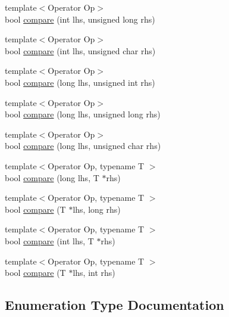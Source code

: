 \begin{DoxyCompactItemize}
\item 
{\footnotesize template$<$Operator Op$>$ }\\bool \hyperlink{namespace_catch_1_1_internal_aac7a6452ed0d324031ceb7b4f3a3b61c}{compare} (int lhs, unsigned long rhs)
\item 
{\footnotesize template$<$Operator Op$>$ }\\bool \hyperlink{namespace_catch_1_1_internal_a7e82d987f62b9822107027c72a55fa6b}{compare} (int lhs, unsigned char rhs)
\item 
{\footnotesize template$<$Operator Op$>$ }\\bool \hyperlink{namespace_catch_1_1_internal_a0b4783ede1901e5c1baf8ff909bcce8d}{compare} (long lhs, unsigned int rhs)
\item 
{\footnotesize template$<$Operator Op$>$ }\\bool \hyperlink{namespace_catch_1_1_internal_ae9aec44a08d9cbb0d3dd46d438b50d2c}{compare} (long lhs, unsigned long rhs)
\item 
{\footnotesize template$<$Operator Op$>$ }\\bool \hyperlink{namespace_catch_1_1_internal_a79664b5f5f497fba57bd156e098de1f2}{compare} (long lhs, unsigned char rhs)
\item 
{\footnotesize template$<$Operator Op, typename T $>$ }\\bool \hyperlink{namespace_catch_1_1_internal_a829570ad9e724c687aa42190a696032b}{compare} (long lhs, T $\ast$rhs)
\item 
{\footnotesize template$<$Operator Op, typename T $>$ }\\bool \hyperlink{namespace_catch_1_1_internal_a3f89c65fdb06aa7b648c5acf0ca107a9}{compare} (T $\ast$lhs, long rhs)
\item 
{\footnotesize template$<$Operator Op, typename T $>$ }\\bool \hyperlink{namespace_catch_1_1_internal_a4f30c29e4adb62c7e209e5b988e59397}{compare} (int lhs, T $\ast$rhs)
\item 
{\footnotesize template$<$Operator Op, typename T $>$ }\\bool \hyperlink{namespace_catch_1_1_internal_a95361ddae55c9a390e6510bdadccb1fc}{compare} (T $\ast$lhs, int rhs)
\end{DoxyCompactItemize}


\subsection{Enumeration Type Documentation}
\hypertarget{namespace_catch_1_1_internal_ae3f96598a7858155750bf38e7295d83e}{}\label{namespace_catch_1_1_internal_ae3f96598a7858155750bf38e7295d83e} 
